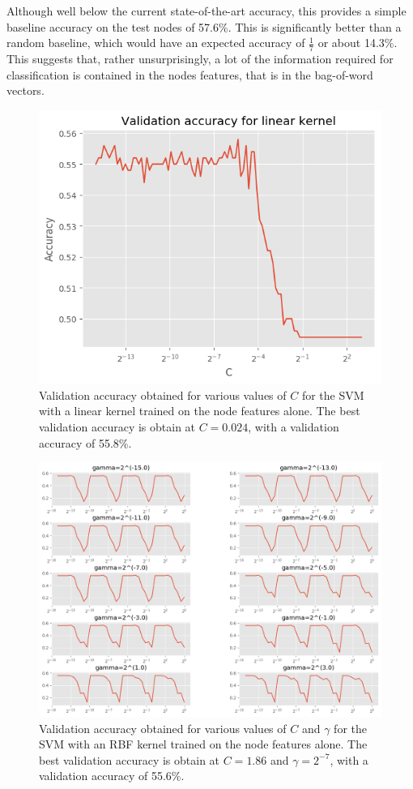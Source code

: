 \documentclass[12pt]{article}
\theoremstyle{definition}
\begin{document}
\bigskip

Although well below the current state-of-the-art accuracy, this provides a simple baseline accuracy on the test nodes of 57.6\%. This is significantly better than a random baseline, which would have an expected accuracy of $\frac{1}{7}$ or about 14.3\%. This suggests that, rather unsurprisingly, a lot of the information required for classification is contained in the nodes features, that is in the bag-of-word vectors. 

\begin{figure}[h]
	\includegraphics[width=1.0\textwidth]{node_svm/linear_reg}
	\centering
	\caption{Validation accuracy obtained for various values of $C$ for the SVM with a linear kernel trained on the node features alone. The best validation accuracy is obtain at $C=0.024$, with a validation accuracy of 55.8\%.}
	\label{fig/node_svm_linear_reg}
\end{figure}
\begin{figure}[h]
	\includegraphics[width=1.0\textwidth]{node_svm/rbf_reg}
	\centering
	\caption{Validation accuracy obtained for various values of $C$ and $\gamma$ for the SVM with an RBF kernel trained on the node features alone. The best validation accuracy is obtain at $C=1.86$ and $\gamma=2^{-7}$, with a validation accuracy of 55.6\%.}
	\label{fig/node_svm_rbf_reg}
\end{figure}
\end{document}
